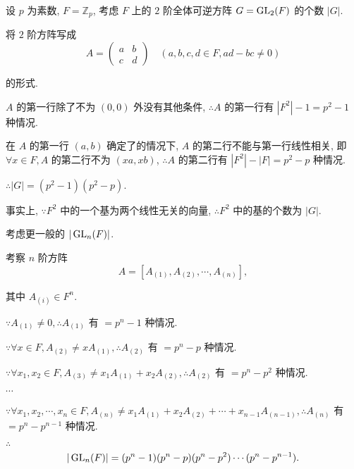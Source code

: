 \documentclass[color=black,device=normal,lang=cn,mode=geye]{elegantnote}
\begin{document}
\begin{example}
    设 $p$ 为素数, $F=\mathbb{Z}_p$, 考虑 $F$ 上的 $2$ 阶全体可逆方阵 $G=\operatorname{GL} _2(F)$ 的个数 $|G|$.

    将 $2$ 阶方阵写成
    \[A=\begin{pmatrix}
        a & b \\
        c & d
    \end{pmatrix}\quad(a,b,c,d\in F,ad-bc\neq0)\]

    的形式.

    $A$ 的第一行除了不为 $(0,0)$ 外没有其他条件, $\therefore A$ 的第一行有 $|F^2|-1=p^2-1$ 种情况.

    在 $A$ 的第一行 $(a,b)$ 确定了的情况下, $A$ 的第二行不能与第一行线性相关, 即 $\forall x\in F,A$ 的第二行不为 $(xa,xb)$, $\therefore A$ 的第二行有 $|F^2|-|F|=p^2-p$ 种情况.

    $\therefore|G|=(p^2-1)(p^2-p)$.

    事实上, $\because F^2$ 中的一个基为两个线性无关的向量, $\therefore F^2$ 中的基的个数为 $|G|$.

    考虑更一般的 $|\operatorname{GL} _n(F)|$.

    考察 $n$ 阶方阵
    \[A=[A_{(1)},A_{(2)},\cdots,A_{(n)}],\]

    其中 $A_{(i)}\in F^n$.

    $\because A_{(1)}\neq0,\therefore A_{(1)}$ 有 $=p^n-1$ 种情况.

    $\because\forall x\in F,A_{(2)}\neq xA_{(1)},\therefore A_{(2)}$ 有 $=p^n-p$ 种情况.

    $\because\forall x_1,x_2\in F,A_{(3)}\neq x_1A_{(1)}+x_2A_{(2)},\therefore A_{(2)}$ 有 $=p^n-p^2$ 种情况.

    $\cdots$

    $\because\forall x_1,x_2,\cdots,x_n\in F,A_{(n)}\neq x_1A_{(1)}+x_2A_{(2)}+\cdots+x_{n-1}A_{(n-1)},\therefore A_{(n)}$ 有 $=p^n-p^{n-1}$ 种情况.

    $\therefore$
    \[|\operatorname{GL}_n(F)|=(p^n-1)(p^n-p)(p^n-p^2)\cdots(p^n-p^{n-1}).\]
\end{example}
\end{document}
